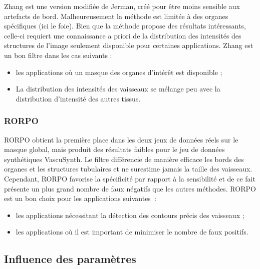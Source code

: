 Zhang est une version modifiée de Jerman, créé pour être moins sensible aux artefacts de bord. Malheureusement la méthode est limitée à des organes spécifiques (ici le  foie). Bien que la méthode propose des résultats intéressants, celle-ci requiert une connaissance a priori de la distribution des intensités des structures de l'image seulement disponible pour certaines applications. Zhang est un bon filtre dans les cas suivants :

\begin{itemize}
\item les applications où un masque des organes d'intérêt est disponible ;
\item La distribution des intensités des vaisseaux se mélange peu avec la distribution d'intensité des autres tissus.
\end{itemize}

\subsubsection*{RORPO}

RORPO obtient la première place dans les deux jeux de données réels sur le masque global, mais produit des résultats faibles pour le jeu de données synthétiques VascuSynth. Le filtre différencie de manière efficace les bords des organes et les structures tubulaires et ne surestime jamais la taille des vaisseaux. Cependant, RORPO favorise la spécificité par rapport à la sensibilité et de ce fait présente un plus grand nombre de faux négatifs que les autres méthodes. RORPO est un bon choix pour les applications suivantes~:

\begin{itemize}
  \item les applications nécessitant la détection des contours précis des vaisseaux ;
  \item les applications où il est important de minimiser le nombre de faux positifs. 
\end{itemize}

\subsection{Influence des paramètres}

